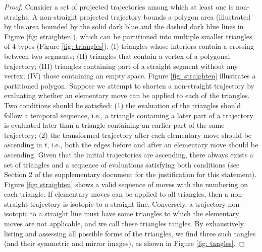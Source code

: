 \documentclass[conference]{IEEEtran}
\begin{document}
\begin{proof}
    Consider a set of projected trajectories among which at least one is non-straight.
    A non-straight projected trajectory bounds a polygon area (illustrated by the area bounded by the solid dark blue and the dashed dark blue lines in Figure \ref{fig: straighten}), which can be partitioned into multiple smaller triangles of $4$ types \cite{prasolov1997knots} (Figure \ref{fig: triangles}): (I) triangles whose interiors contain a crossing between two segments; (II) triangles that contain a vertex of a polygonal trajectory; (III) triangles containing part of a straight segment without any vertex; (IV) those containing an empty space.
    Figure \ref{fig: straighten} illustrates a partitioned polygon.
    Suppose we attempt to shorten a non-straight trajectory by evaluating whether an elementary move can be applied to each of the triangles.
    Two conditions should be satisfied:
    (1) the evaluation of the triangles should follow a temporal sequence, i.e., 
    a triangle containing a later part of a trajectory is evaluated later than a triangle containing an earlier part of the same trajectory;
    (2) the transformed trajectory after each elementary move should be ascending in $t$, i.e., both the edges before and after an elementary move should be ascending.
    Given that the initial trajectories are ascending, there always exists a set of triangles and a sequence of evaluations satisfying both conditions (see Section 2 of the supplementary document for the justification for this statement).
    Figure \ref{fig: straighten} shows a valid sequence of moves with the numbering on each triangle.
    If elementary moves can be applied to all triangles, then a non-straight trajectory is isotopic to a straight line.
    Conversely, a trajectory non-isotopic to a straight line must have some triangles to which the elementary moves are not applicable, and we call these triangles tangles.
    By exhaustively listing and assessing all possible forms of the triangles, we find three such tangles (and their symmetric and mirror images), as shown in Figure \ref{fig: tangles}.
    

\end{proof}
\end{document}
